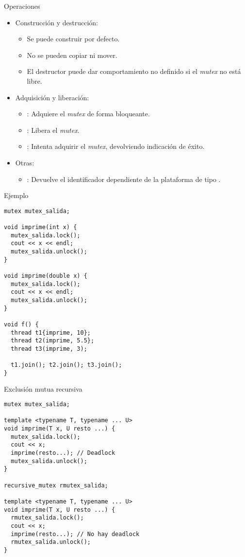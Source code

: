 \begin{frame}{Operaciones}
\begin{itemize}
  \item Construcción y destrucción:
    \begin{itemize}
      \item Se puede construir por defecto.
      \item No se pueden copiar ni mover.
      \item El destructor puede dar comportamiento no definido si el \emph{mutex} no está libre.
    \end{itemize}
  \item Adquisición y liberación:
    \begin{itemize}
      \item {}: Adquiere el \emph{mutex} de forma bloqueante.
      \item {}: Libera el \emph{mutex}.
      \item {}: Intenta adquirir el \emph{mutex}, devolviendo indicación de éxito.
    \end{itemize}
  \item Otras:
    \begin{itemize}
      \item {}: Devuelve el identificador dependiente de la plataforma de tipo
            .
    \end{itemize}
\end{itemize}
\end{frame}

\begin{frame}[fragile]{Ejemplo}
\begin{lstlisting}
mutex mutex_salida;

void imprime(int x) {
  mutex_salida.lock();
  cout << x << endl;
  mutex_salida.unlock();
}

void imprime(double x) {
  mutex_salida.lock();
  cout << x << endl;
  mutex_salida.unlock();
}

void f() {
  thread t1{imprime, 10};
  thread t2(imprime, 5.5};
  thread t3(imprime, 3);
 
  t1.join(); t2.join(); t3.join();
}
\end{lstlisting}
\end{frame}

\begin{frame}[fragile]{Exclusión mutua recursiva}
\begin{lstlisting}
mutex mutex_salida;

template <typename T, typename ... U>
void imprime(T x, U resto ...) {
  mutex_salida.lock();
  cout << x;
  imprime(resto...); // Deadlock
  mutex_salida.unlock();
}

recursive_mutex rmutex_salida;

template <typename T, typename ... U>
void imprime(T x, U resto ...) {
  rmutex_salida.lock();
  cout << x;
  imprime(resto...); // No hay deadlock
  rmutex_salida.unlock();
}
\end{lstlisting}
\end{frame}

